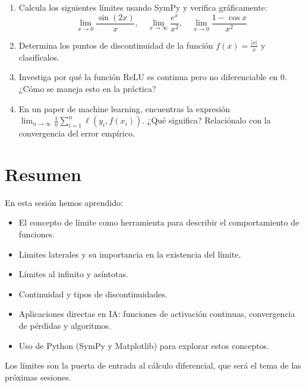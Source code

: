 \documentclass[12pt,a4paper,openany,oneside]{book}
\begin{document}
\begin{enumerate}
    \item Calcula los siguientes límites usando SymPy y verifica gráficamente:
    \[
    \lim_{x \to 0} \frac{\sin(2x)}{x}, \quad \lim_{x \to \infty} \frac{e^x}{x^2}, \quad \lim_{x \to 0} \frac{1-\cos x}{x^2}
    \]
    \item Determina los puntos de discontinuidad de la función $f(x) = \frac{|x|}{x}$ y clasifícalos.
    \item Investiga por qué la función ReLU es continua pero no diferenciable en 0. ¿Cómo se maneja esto en la práctica?
    \item En un paper de machine learning, encuentras la expresión $\lim_{n \to \infty} \frac{1}{n} \sum_{i=1}^n \ell(y_i, f(x_i))$. ¿Qué significa? Relaciónalo con la convergencia del error empírico.
\end{enumerate}

\section{Resumen}

En esta sesión hemos aprendido:
\begin{itemize}
    \item El concepto de límite como herramienta para describir el comportamiento de funciones.
    \item Límites laterales y su importancia en la existencia del límite.
    \item Límites al infinito y asíntotas.
    \item Continuidad y tipos de discontinuidades.
    \item Aplicaciones directas en IA: funciones de activación continuas, convergencia de pérdidas y algoritmos.
    \item Uso de Python (SymPy y Matplotlib) para explorar estos conceptos.
\end{itemize}
Los límites son la puerta de entrada al cálculo diferencial, que será el tema de las próximas sesiones.
\end{document}

